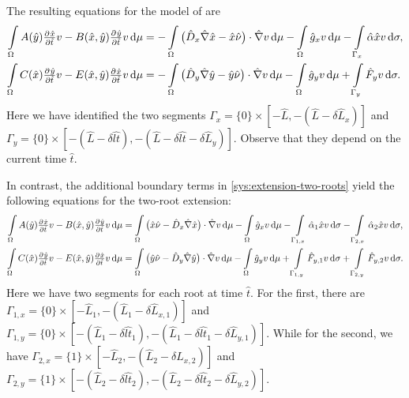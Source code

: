 \documentclass[11pt]{article}
\numberwithin{equation}{section}
\begin{document}
The resulting equations for the model of \cite{Ptashnyk-2011} are
\begin{equation}
\label{eq:var-time-model-1}
\begin{aligned}
    \int\limits_\Omega
    A(\hat y) \pd{\hat{x}}{\hat{t}} v 
    -
    B(\hat x, \hat y) \pd{\hat y}{\hat t} v
    \dif\mu
    &=
    -\int\limits_\Omega 
    \big( \hat{D}_x \hat{\nabla} \hat{x} - \hat{x}\hat{\nu}\big) \cdot \hat{\nabla} v \dif\mu
    -\int\limits_\Omega \hat{g}_x v \dif\mu
    -\int\limits_{\Gamma_{x}}    \hat{\alpha} \hat{x} v    \dif \sigma,
    \\
    \int\limits_\Omega
    C(\hat{x})  \pd{\hat{y}}{\hat{t}} v 
    -
    E(\hat{x},\hat{y})  \pd{\hat x}{\hat t} v
    \dif\mu
    &=
    -\int\limits_\Omega 
    \big(\hat{D}_y \hat{\nabla} \hat{y} - \hat{y}\hat{\nu} \big) \cdot \hat{\nabla} v \dif\mu
    -\int\limits_\Omega \hat{g}_y v \dif\mu
    +\int\limits_{\Gamma_{y}}    \hat{F}_y v    \dif \sigma.
\end{aligned}
\end{equation}
Here we have identified the two segments $\Gamma_{x} = \{0\}\times [-\hat{L}, -(\hat{L}-\delta \hat{L}_x)]$ and $\Gamma_{y} = \{0\}\times [-(\hat{L} - \delta \widehat{lt}), -(\hat{L} - \delta \widehat{lt} - \delta \hat{L}_y)]$. Observe that they depend on the current time \(\hat t\).

In contrast, the additional boundary terms in \eqref{sys:extension-two-roots} yield the following equations for the two-root extension:
\begin{equation}
\label{eq:var-time-model-2}
\begin{aligned}
    \int\limits_\Omega
    A(\hat y) \pd{\hat{x}}{\hat{t}} v 
    -
    B(\hat x, \hat y) \pd{\hat y}{\hat t} v
    \dif\mu
    &=
    \int\limits_\Omega 
    \big( \hat{x}\hat{\nu} - \hat{D}_x \hat{\nabla} \hat{x}\big) \cdot \hat{\nabla} v \dif\mu
    -\int\limits_\Omega \hat{g}_x v \dif\mu
    -\int\limits_{\Gamma_{1,x}}    \hat{\alpha}_1 \hat{x} v    \dif \sigma
    -\int\limits_{\Gamma_{2,x}}    \hat{\alpha}_2 \hat{x} v    \dif \sigma,
    \\
    \int\limits_\Omega
    C(\hat{x})  \pd{\hat{y}}{\hat{t}} v 
    -
    E(\hat{x},\hat{y})  \pd{\hat x}{\hat t} v
    \dif\mu
    &=
    \int\limits_\Omega 
    \big(\hat{y}\hat{\nu} - \hat{D}_y \hat{\nabla} \hat{y} \big) \cdot \hat{\nabla} v \dif\mu
    -\int\limits_\Omega \hat{g}_y v \dif\mu
    +\int\limits_{\Gamma_{1,y}}    \hat{F}_{y,1} v    \dif \sigma
    +\int\limits_{\Gamma_{2,y}}    \hat{F}_{y,2} v    \dif \sigma.
\end{aligned}
\end{equation}
Here we have two segments for each root at time \(\hat t\). For the first, there are \(\Gamma_{1,x} = \{0\}\times [-\hat{L}_1,-(\hat{L}_1 - \delta \hat{L}_{x,1})]\) and \(\Gamma_{1,y} = \{0\}\times [-(\hat{L}_1 - \delta \widehat{lt}_1), -(\hat{L}_1 - \delta \widehat{lt}_1 - \delta \hat{L}_{y,1})] \). While for the second, we have \( \Gamma_{2,x} = \{1\}\times [-\hat{L}_2, -(\hat{L}_2 - \delta \hat{L}_{x,2})]\) and \(\Gamma_{2,y} = \{1\} \times [-(\hat{L}_2 - \delta \widehat{lt}_2), -(\hat{L}_2 - \delta \widehat{lt}_2 - \delta \hat{L}_{y,2})]\). 
\end{document}
